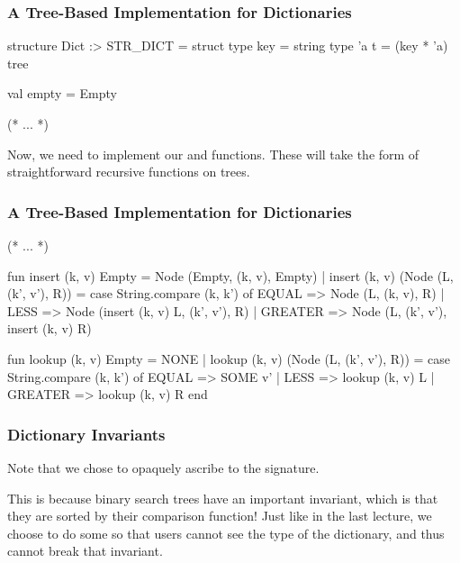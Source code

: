 \documentclass[aspectratio=169, handout]{beamer}
\begin{document}
\begin{frame}[fragile]
  \frametitle{A Tree-Based Implementation for Dictionaries}

  \begin{codeblock}
    structure Dict :> STR_DICT =
      struct
        type key = string
        type 'a t = (key * 'a) tree

        val empty = Empty

        (* ... *)
  \end{codeblock}

  \pause
  \vspace{\fill}

  Now, we need to implement our  and  functions.
  These will take the form of straightforward recursive functions on trees.

  \pause
  \vspace{\fill}

\end{frame}

\begin{frame}[fragile]
  \frametitle{A Tree-Based Implementation for Dictionaries}
  \small
  \begin{codeblock}
    (* ... *)

      fun insert (k, v) Empty = Node (Empty, (k, v), Empty)
        | insert (k, v) (Node (L, (k', v'), R)) =
            case String.compare (k, k') of
              EQUAL   => Node (L, (k, v), R)
            | LESS    => Node (insert (k, v) L, (k', v'), R)
            | GREATER => Node (L, (k', v'), insert (k, v) R)

      fun lookup (k, v) Empty = NONE
        | lookup (k, v) (Node (L, (k', v'), R)) =
            case String.compare (k, k') of
              EQUAL   => SOME v'
            | LESS    => lookup (k, v) L
            | GREATER => lookup (k, v) R
    end
\end{codeblock}
\end{frame}

\begin{frame}[fragile]
  \frametitle{Dictionary Invariants}

  Note that we chose to opaquely ascribe to the  signature.

  \pause
  \vspace{\fill}

  This is because binary search trees have an important invariant, which
  is that they are sorted by their comparison function! Just like in the
  last lecture, we choose to do some  so that
  users cannot see the type of the dictionary, and thus cannot break that
  invariant.
\end{frame}
\end{document}
